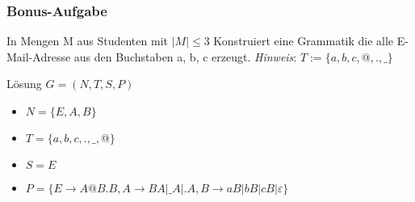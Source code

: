 \begin{frame}
  \frametitle{Bonus-Aufgabe}
  \begin{exampleblock}{In Mengen M aus Studenten mit $|M| \leq 3$}
    Konstruiert eine Grammatik die alle E-Mail-Adresse aus den Buchstaben {a, b, c} erzeugt.
    \emph{Hinweis}: $T := \{a, b, c, @, ., \_\}$
  \end{exampleblock}\pause
  \begin{exampleblock}{Lösung}
    $G = (N, T, S, P)$
    \begin{itemize}
      \item $N = \{E, A, B\}$
      \item $T = \{a, b, c, ., \_, @\}$
      \item $S = E$
      \item $P = \{E \longrightarrow A@B.B, A \longrightarrow BA|\_A|.A, B \longrightarrow aB | bB | cB | \varepsilon\}$
    \end{itemize}
  \end{exampleblock}
\end{frame}
